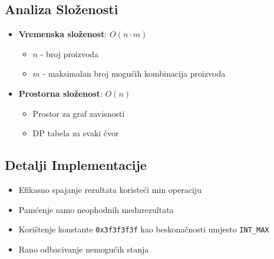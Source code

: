 \subsection{Analiza Složenosti}
\begin{itemize}
    \item \textbf{Vremenska složenost}: $O(n \cdot m)$
        \begin{itemize}
            \item $n$ - broj proizvoda
            \item $m$ - maksimalan broj mogućih kombinacija proizvoda
        \end{itemize}
    \item \textbf{Prostorna složenost}: $O(n)$
        \begin{itemize}
            \item Prostor za graf zavisnosti
            \item DP tabela za svaki čvor
        \end{itemize}
\end{itemize}

\subsection{Detalji Implementacije}
\begin{itemize}
    \item Efikasno spajanje rezultata koristeći min operaciju
    \item Pamćenje samo neophodnih međurezultata
    \item Korištenje konstante \texttt{0x3f3f3f3f} kao beskonačnosti umjesto \texttt{INT\_MAX}
    \item Rano odbacivanje nemogućih stanja
\end{itemize} 